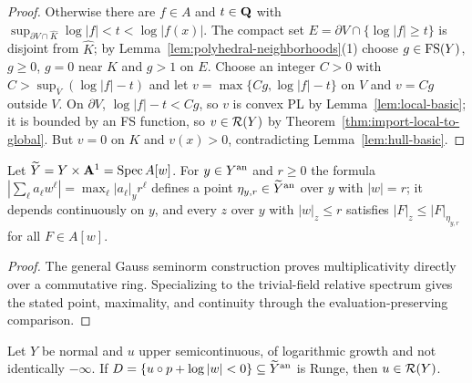 \begin{proof}
Otherwise there are $f\in A$ and $t\in\mathbf{Q}$ with $\sup_{\partial V\cap\widehat K}\log|f|<t<\log|f(x)|$.
The compact set $E=\partial V\cap\{\log|f|\ge t\}$ is disjoint from $\widehat K$; by
Lemma~\ref{lem:polyhedral-neighborhoods}(1) choose $g\in\mathrm{FS}(Y)$, $g\ge0$, $g=0$ near $\widehat K$ and
$g>1$ on $E$. Choose an integer $C>0$ with $C>\sup_{\overline V}(\log|f|-t)$ and let
$v=\max\{Cg,\log|f|-t\}$ on $V$ and $v=Cg$ outside $V$. On $\partial V$, $\log|f|-t<Cg$, so $v$ is
convex PL by Lemma~\ref{lem:local-basic}; it is bounded by an FS function, so
$v\in\mathcal{R}(Y)$ by Theorem~\ref{thm:import-local-to-global}. But $v=0$ on $K$ and $v(x)>0$,
contradicting Lemma~\ref{lem:hull-basic}.
\end{proof}

\begin{lemma}\label{lem:gauss-point}
\leanok
{}
Let $\widetilde Y=Y\times\mathbf{A}^1=\operatorname{Spec} A[w]$. For $y\in Y^{\mathrm{an}}$ and $r\ge0$ the formula
$|\sum_\ell a_\ell w^\ell|=\max_\ell|a_\ell|_yr^\ell$ defines a point $\eta_{y,r}\in\widetilde Y^{\mathrm{an}}$
over $y$ with $|w|=r$; it depends continuously on $y$, and every $z$ over $y$ with $|w|_z\le r$
satisfies $|F|_z\le|F|_{\eta_{y,r}}$ for all $F\in A[w]$.
\end{lemma}

\begin{proof}
The general Gauss seminorm construction proves multiplicativity directly over a
commutative ring. Specializing to the trivial-field relative spectrum gives the
stated point, maximality, and continuity through the evaluation-preserving comparison.
\end{proof}

\begin{lemma}\label{lem:hartogs}
\leanok
{}
Let $Y$ be normal and $u$ upper semicontinuous, of logarithmic growth and not identically
$-\infty$. If $D=\{u\circ p+\log|w|<0\}\subseteq\widetilde Y^{\mathrm{an}}$ is Runge, then $u\in\mathcal{R}(Y)$.
\end{lemma}


